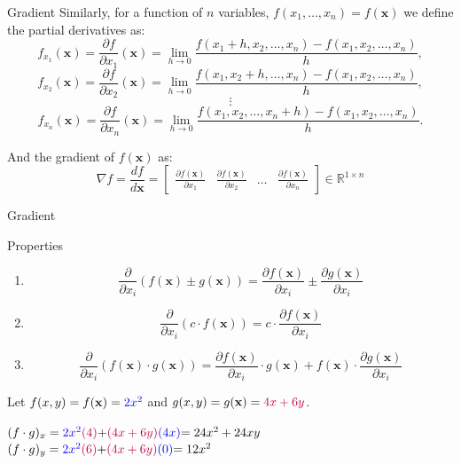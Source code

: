 \documentclass{beamer}
\newcommand{\vx}{\mathbf{x}}
\begin{document}
\begin{frame}{Gradient}
Similarly, for a function of $n$ variables, $f(x_1,\dots,x_n)=f(\vx)$ we define the partial derivatives as:
\[
f_{x_1}(\vx) = \frac{\partial f}{\partial x_1}(\vx) = \lim_{{h \to 0}} \frac{f(x_1 + h, x_2, \ldots, x_n) - f(x_1, x_2, \ldots, x_n)}{h},
\]
\[
f_{x_2}(\vx) = \frac{\partial f}{\partial x_2}(\vx) = \lim_{{h \to 0}} \frac{f(x_1, x_2+h, \ldots, x_n) - f(x_1, x_2, \ldots, x_n)}{h},
\]
\[
\vdots
\]
\[
f_{x_n}(\vx) = \frac{\partial f}{\partial x_n}(\vx) = \lim_{{h \to 0}} \frac{f(x_1, x_2, \ldots, x_n + h) - f(x_1, x_2, \ldots, x_n)}{h}.
\]

And the gradient of $f(\vx)$ as:
\[
\nabla f = \frac{df}{d\vx} =
\begin{bmatrix}
\frac{\partial f(\vx)}{\partial x_1} & \frac{\partial f(\vx)}{\partial x_2} & \ldots & \frac{\partial f(\vx)}{\partial x_n}
\end{bmatrix}
\in \mathbb{R}^{1 \times n}
\]

\end{frame}



\begin{frame}{Gradient}
\begin{block}{Properties}
    \begin{enumerate}
        \item \[\frac{\partial}{\partial x_i} (f(\vx) \pm g(\vx)) = \frac{\partial f(\vx)}{\partial x_i} \pm \frac{\partial g(\vx)}{\partial x_i}\]
        
        \item \[\frac{\partial}{\partial x_i} (c \cdot f(\vx)) = c\cdot\frac{\partial f(\vx)}{\partial x_i} \]

        \item \[\frac{\partial}{\partial x_i} (f(\vx) \cdot g(\vx)) = \frac{\partial f(\vx)}{\partial x_i} \cdot g(\vx) + f(\vx) \cdot \frac{\partial g(\vx)}{\partial x_i}
\]
    \end{enumerate}
\end{block}
\pause
\begin{example}
    Let \( f(x,y)=f(\vx) = \color{blue}{2x^2} \) and \( g(x,y)=g(\vx) =\color{purple}{4x + 6y} \).

\begin{center}
    $(f\cdot g)_{x} = \color{blue}{2x^{2}}\color{purple}{(4)} \color{black}{+} \color{purple}{(4x + 6y)}\color{blue}{(4x}) \color{black}{= 24x^{2} + 24xy}$\\
    $(f\cdot g)_{y} = \color{blue}{2x^{2}}\color{purple}{(6)} \color{black}{+} \color{purple}{(4x + 6y)}\color{blue}{(0}) \color{black}{= 12x^{2}}$
\end{center}

\end{example}

\end{frame}
\end{document}
